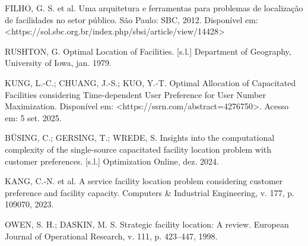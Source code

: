 \documentclass[12pt]{article}
\begin{document}
\begin{thebibliography}{99}

 FILHO, G. S. et al. Uma arquitetura e ferramentas para problemas de localização de facilidades no setor público. São Paulo: SBC, 2012. Disponível em: <https://sol.sbc.org.br/index.php/sbsi/article/view/14428>

 RUSHTON, G. Optimal Location of Facilities. [s.l.] Department of Geography, University of Iowa, jan. 1979.

 KUNG, L.-C.; CHUANG, J.-S.; KUO, Y.-T. Optimal Allocation of Capacitated Facilities considering Time-dependent User Preference for User Number Maximization. Disponível em: <https://ssrn.com/abstract=4276750>. Acesso em: 5 set. 2025. 

 BÜSING, C.; GERSING, T.; WREDE, S. Insights into the computational complexity of the single-source capacitated facility location problem with customer preferences. [s.l.] Optimization Online, dez. 2024. 

 KANG, C.-N. et al. A service facility location problem considering customer preference and facility capacity. Computers \& Industrial Engineering, v. 177, p. 109070, 2023.

 OWEN, S. H.; DASKIN, M. S. Strategic facility location: A review. European Journal of Operational Research, v. 111, p. 423–447, 1998. 

\end{thebibliography}
\end{document}
